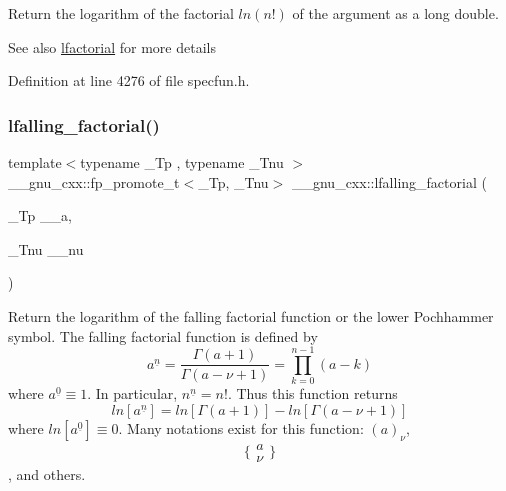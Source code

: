 Return the logarithm of the factorial $ ln(n!) $ of the argument as a {\ttfamily long double}.

\begin{DoxySeeAlso}{See also}
\hyperlink{group__gnu__math__spec__func_gab256f8d7b77b9a8fefafca21827166eb}{lfactorial} for more details 
\end{DoxySeeAlso}


Definition at line 4276 of file specfun.\+h.

\mbox{\label{group__gnu__math__spec__func_ga2032c10640d5010666d60d9faec86c32}} 
\subsubsection{\texorpdfstring{lfalling\+\_\+factorial()}{lfalling\_factorial()}}
{\footnotesize\ttfamily template$<$typename \+\_\+\+Tp , typename \+\_\+\+Tnu $>$ \\
\+\_\+\+\_\+gnu\+\_\+cxx\+::fp\+\_\+promote\+\_\+t$<$\+\_\+\+Tp, \+\_\+\+Tnu$>$ \+\_\+\+\_\+gnu\+\_\+cxx\+::lfalling\+\_\+factorial (\begin{DoxyParamCaption}\item[{\+\_\+\+Tp}]{\+\_\+\+\_\+a,  }\item[{\+\_\+\+Tnu}]{\+\_\+\+\_\+nu }\end{DoxyParamCaption})\hspace{0.3cm}{\ttfamily [inline]}}



Return the logarithm of the falling factorial function or the lower Pochhammer symbol. The falling factorial function is defined by \[ a^{\underline{n}} = \frac{\Gamma(a + 1)}{\Gamma(a - \nu + 1)} = \prod_{k=0}^{n-1} (a - k) \] where $ a^{\underline{0}} \equiv 1 $. In particular, $ n^{\underline{n}} = n! $. Thus this function returns \[ ln[a^{\underline{n}}] = ln[\Gamma(a + 1)] - ln[\Gamma(a - \nu + 1)] \] where $ ln[a^{\underline{0}}] \equiv 0 $. Many notations exist for this function\+: $ (a)_\nu $, \[ \{ \begin{array}{c} a \\ \nu \end{array} \} \], and others. 



